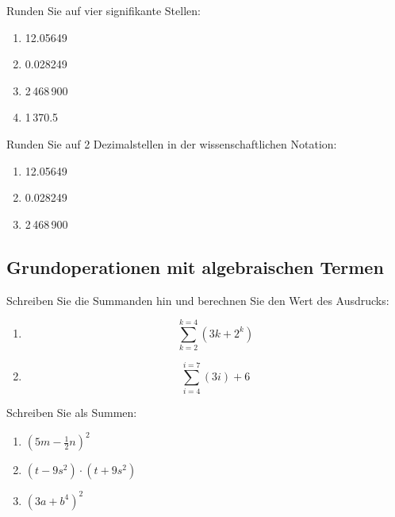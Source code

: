 Runden Sie auf vier signifikante Stellen:

\begin{multicols}{2}
\begin{enumerate}[label=\alph*)]
 \item 12.05649  
 \item 0.028249 
 \item 2\,468\,900  
 \item 1\,370.5   
\end{enumerate}
\end{multicols}

Runden Sie auf 2 Dezimalstellen in der wissenschaftlichen Notation:
\begin{multicols}{2}
\begin{enumerate}[label=\alph*)]
 \item 12.05649  
 \item 0.028249 
 \item 2\,468\,900  
\end{enumerate}
\end{multicols}


\subsection{Grundoperationen mit algebraischen Termen}
Schreiben Sie die Summanden hin und berechnen Sie den Wert des Ausdrucks:
\begin{enumerate}[label=\alph*)]
 \item $$\sum_{k=2}^{k=4}{(3k+2^k)}$$ 
 \item $$\sum_{i=4}^{i=7}(3i) + 6$$   
\end{enumerate}


Schreiben Sie als Summen:

\begin{multicols}{2}
\begin{enumerate}[label=\alph*)]
\item $\left(5m-\frac{1}{2}n\right)^2$
\item $(t-9s^2)\cdot(t+9s^2)$
  \item $(3a + b^4)^2$
  \end{enumerate}
\end{multicols}

